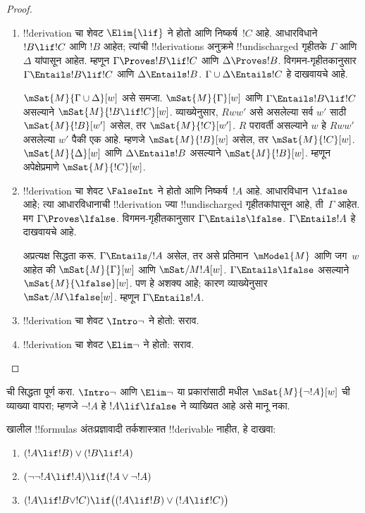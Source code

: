 \documentclass[../../../include/open-logic-section]{subfiles}
\begin{document}
\begin{proof}
\begin{enumerate}
  \item !!{derivation} चा शेवट $\Elim{\lif}$ ने होतो
    आणि निष्कर्ष~$!C$ आहे. आधारविधाने
    $!B \lif !C$ आणि $!B$ आहेत;
    त्यांची !!{derivation}s अनुक्रमे
    !!{undischarged} गृहीतके $\Gamma$ आणि
    $\Delta$ यांपासून आहेत. म्हणून
    $\Gamma \Proves !B \lif !C$ आणि
    $\Delta \Proves !B$.
    विगमन-गृहीतकानुसार
    $\Gamma \Entails !B \lif !C$
    आणि $\Delta \Entails !B$.
    $\Gamma \cup \Delta \Entails !C$
    हे दाखवायचे आहे.

    $\mSat{M}{\Gamma \cup \Delta}[w]$ असे समजा.
    $\mSat{M}{\Gamma}[w]$ आणि
    $\Gamma \Entails !B \lif !C$ असल्याने
    $\mSat{M}{!B \lif !C}[w]$.
    व्याख्येनुसार, $Rww'$ असे असलेल्या
    सर्व $w'$ साठी $\mSat{M}{!B}[w']$
    असेल, तर $\mSat{M}{!C}[w']$.
    $R$ परावर्ती असल्याने $w$ हे
    $Rww'$ असलेल्या $w'$ पैकी एक आहे.
    म्हणजे $\mSat{M}{!B}[w]$ असेल,
    तर $\mSat{M}{!C}[w]$.
    $\mSat{M}{\Delta}[w]$ आणि
    $\Delta \Entails !B$ असल्याने
    $\mSat{M}{!B}[w]$. म्हणून
    अपेक्षेप्रमाणे $\mSat{M}{!C}[w]$.

  \item !!{derivation} चा शेवट $\FalseInt$ ने होतो
    आणि निष्कर्ष~$!A$ आहे. आधारविधान
    $\lfalse$ आहे; त्या आधारविधानाची
    !!{derivation} ज्या
    !!{undischarged} गृहीतकांपासून आहे,
    ती~$\Gamma$ आहेत. मग
    $\Gamma \Proves \lfalse$.
    विगमन-गृहीतकानुसार
    $\Gamma \Entails \lfalse$.
    $\Gamma \Entails !A$ हे दाखवायचे आहे.

    अप्रत्यक्ष सिद्धता करू.
    $\Gamma \Entails/ !A$ असेल, तर
    असे प्रतिमान~$\mModel{M}$ आणि जग~$w$
    आहेत की $\mSat{M}{\Gamma}[w]$
    आणि $\mSat/{M}{!A}[w]$.
    $\Gamma \Entails \lfalse$
    असल्याने $\mSat{M}{\lfalse}[w]$.
    पण हे अशक्य आहे; कारण व्याख्येनुसार
    $\mSat/{M}{\lfalse}[w]$.
    म्हणून $\Gamma \Entails !A$.
  \item !!{derivation} चा शेवट $\Intro\lnot$ ने होतो: सराव.
  \item !!{derivation} चा शेवट $\Elim\lnot$ ने होतो: सराव.
  \end{enumerate}
\end{proof}

\begin{prob}
   ची सिद्धता
  पूर्ण करा. $\Intro\lnot$ आणि $\Elim\lnot$
  या प्रकारांसाठी
   मधील
  $\mSat{M}{\lnot !A}[w]$ ची व्याख्या वापरा;
  म्हणजे $\lnot !A$ हे
  $!A \lif \lfalse$ ने व्याख्यित आहे
  असे मानू नका.
\end{prob}

\begin{prob}
  खालील !!{formula}s अंतःप्रज्ञावादी तर्कशास्त्रात
  !!{derivable} नाहीत, हे दाखवा:
  \begin{enumerate}
    \item $(!A \lif !B) \lor (!B \lif !A)$
    \item $(\lnot\lnot !A \lif !A) \lif (!A \lor \lnot !A)$
    \item $(!A \lif !B \lor !C) \lif \bigl((!A \lif !B)\lor(!A \lif !C)\bigr)$
  \end{enumerate}
\end{prob}
\end{document}
